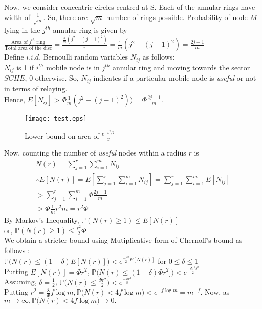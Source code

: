 \documentclass[conference]{IEEEtran}
\begin{document}
Now, we consider concentric circles  centred at S. Each of the annular rings have width of $\frac{1}{\sqrt{m}}$. So, there are $\sqrt{m}$ number of rings possible.
Probability of node $M$ lying in the $j^{th}$ annular ring is given by\\$\frac{\mbox{Area of $j^{th}$ ring}}{\mbox{Total area of the disc}}= 
\frac{\frac{\pi}{m}(j^2-(j-1)^2)}{\pi}=\frac{1}{m}(j^2-(j-1)^2)=\frac{2j-1}{m}$\\
Define $i.i.d.$ Bernoulli random variables $N_{ij}$ as follows:\\
$N_{ij}$ is 1 if $i^{th}$ mobile node is in $j^{th}$ annular ring and moving towards the sector $SCHE$, 0 otherwise.
So, $N_{ij}$ indicates if a particular mobile node is \textit{useful} or not in terms of relaying.\\
Hence, $E[N_{ij}]>\Phi\frac{1}{m}(j^2-(j-1)^2)) =\Phi\frac{2j-1}{m}$.
\begin{figure}[H] \centering \label{con} \texttt{[image: test.eps]}
\caption{Lower bound on area of $\frac{e^{{-x^2}/2}}{x}$}
\end{figure}
Now, counting the number of \textit{useful} nodes within a radius $r$ is
\begin{gather*}
N(r)=\sum_{j=1}^{r}\sum_{i=1}^{m}N_{ij}\\
\therefore E[N(r)]=E[\sum_{j=1}^{r}\sum_{i=1}^{m}N_{ij}]=\sum_{j=1}^{r}\sum_{i=1}^{m}E[N_{ij}]\\>\sum_{j=1}^{r}\sum_{i=1}^{m}\Phi\frac{2j-1}{m}\\
>\Phi\frac{1}{m}r^2m=r^2\Phi
\end{gather*}
By Markov's Inequality, $\mathbb{P}(N(r)\geq1)\leq E[N(r)]$\\
or, $\mathbb{P}(N(r)\geq1)\leq\frac{r^2}{2}\Phi$\\
We obtain a stricter bound using Mutiplicative form of Chernoff's bound as follows :\\
$\mathbb{P}\Big(N(r)\leq(1-\delta)E[N(r)]\Big)<e^{\frac{-\delta^2}{2}E[N(r)]}$ \quad for $0\leq\delta\leq1$\\
Putting $E[N(r)]=\Phi r^2$, $\mathbb{P}\Big(N(r)\leq(1-\delta)\Phi r^2]\Big)<e^{\frac{-\Phi r^2\delta^2}{2}}$\\
Assuming, $\delta=\frac{1}{2}$, $\mathbb{P}\Big(N(r)\leq\frac{\Phi r^2}{2}\Big)<e^{\frac{-\Phi r^2}{8}}$\\
Putting $r^2=\frac{8}{\Phi}f\log m, \mathbb{P}\Big(N(r)<4f\log m\Big)<e^{-f\log m}=m^{-f}.$ Now, as $m\rightarrow\infty, \mathbb{P}\Big(N(r)<4f\log m\Big)\rightarrow0.$\\
\end{document}

